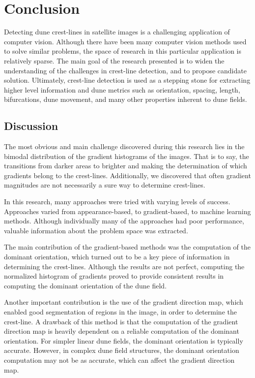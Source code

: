 \section{Conclusion} \label{sec:conclusion}

Detecting dune crest-lines in satellite images is a challenging application of computer vision. Although there have been many computer vision methods used to solve similar problems, the space of research in this particular application is relatively sparse. The main goal of the research presented is to widen the understanding of the challenges in crest-line detection, and to propose candidate solution. Ultimately, crest-line detection is used as a stepping stone for extracting higher level information and dune metrics such as orientation, spacing, length, bifurcations, dune movement, and many other properties inherent to dune fields.  

\subsection{Discussion}

The most obvious and main challenge discovered during this research lies in the bimodal distribution of the gradient histograms of the images. That is to say, the transitions from darker areas to brighter and making the determination of which gradients belong to the crest-lines. Additionally, we discovered that often gradient magnitudes are not necessarily a sure way to determine crest-lines. 

In this research, many approaches were tried with varying levels of success. Approaches varied from appearance-based, to gradient-based, to machine learning methods. Although individually many of the approaches had poor performance, valuable information about the problem space was extracted. 

The main contribution of the gradient-based methods was the computation of the dominant orientation, which turned out to be a key piece of information in determining the crest-lines. Although the results are not perfect, computing the normalized histogram of gradients proved to provide consistent results in computing the dominant orientation of the dune field.

Another important contribution is the use of the gradient direction map, which enabled good segmentation of regions in the image, in order to determine the crest-line. A drawback of this method is that the computation of the gradient direction map is heavily dependent on a reliable computation of the dominant orientation. For simpler linear dune fields, the dominant orientation is typically accurate. However, in complex dune field structures, the dominant orientation computation may not be as accurate, which can affect the gradient direction map.

